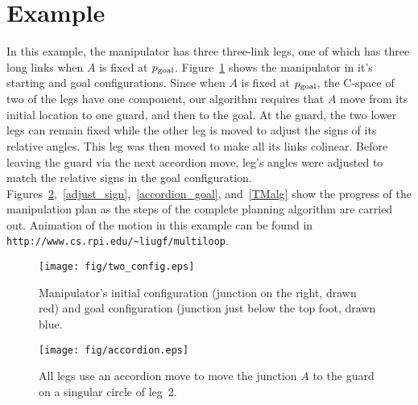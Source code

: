 \documentclass[twocolumn]{IEEEtran}
\begin{document}
\section{Example}
In this example, the manipulator has three three-link legs, one of
which has three long links when $A$ is fixed at 
$p_{\rm goal}$. Figure~\ref{start-goal} shows the manipulator in
it's starting and goal configurations.  Since when $A$ is fixed at
$p_{\rm goal}$, the C-space of two of the legs have one component,
our algorithm requires that $A$ move from its initial location to
one guard, and then to the goal.  At the guard, the two lower legs can remain fixed while the other leg is
moved to adjust the signs of its relative angles.  
This leg was then moved to make all its
links colinear. Before leaving the guard via the next
accordion move, leg's angles were adjusted to match the relative
signs in the goal configuration.
Figures~\ref{accordion},~\ref{adjust_sign},~\ref{accordion_goal},
and~\ref{TMalg} show the progress of the manipulation plan as the
steps of the complete planning algorithm are carried out.
 Animation of the motion in
this example can be found in
\verb$http://www.cs.rpi.edu/~liugf/multiloop$.
\begin{figure}
  \centering
  \texttt{[image: fig/two\_config.eps]}
  \caption{Manipulator's initial configuration (junction on the right, drawn red)
  and goal configuration (junction just below the top foot, drawn blue.}
  \label{start-goal}
\end{figure}

\begin{figure}
  \centering
  \texttt{[image: fig/accordion.eps]}
  \caption{All legs use an accordion move to move the junction $A$ to the guard on
  a singular circle of leg~2.}
  \label{accordion}
\end{figure}
\end{document}
